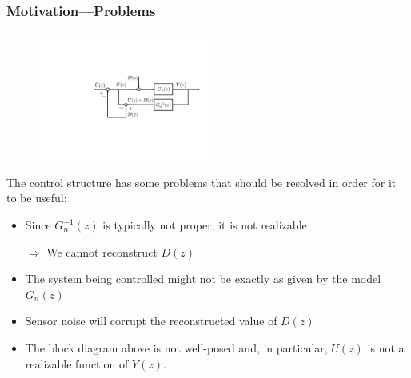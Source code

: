 \begin{frame}
    \frametitle{Motivation---Problems}
    \begin{figure}
        \includegraphics[width=0.5\textwidth]{Disturbance_Observer_motiv4}\\
    \end{figure}

    The control structure has some problems that should be resolved in order for it to be useful:

    \begin{itemize}
    \item
    Since $G_n^{-1}(z)$ is typically not proper, it is not realizable
    \pause

    $\Rightarrow$ We cannot reconstruct $D(z)$
    \pause

    \item
    The system being controlled might not be exactly as given by the model $G_n(z)$
    \pause

    \item
    Sensor noise will corrupt the reconstructed value of $D(z)$
    \pause
    
    \item
    The block diagram above is not well-posed and, in particular, $U(z)$ is not a realizable function of $Y(z)$.

    \end{itemize}
\end{frame}


